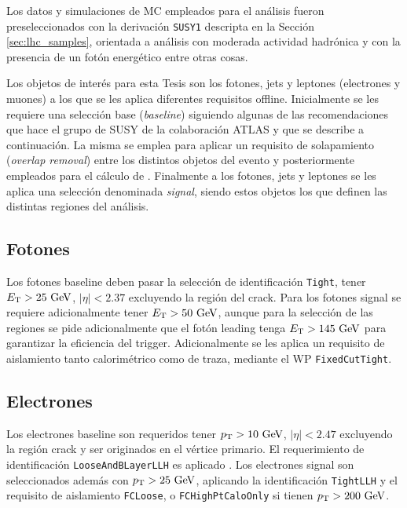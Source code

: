 Los datos y simulaciones de MC empleados para el análisis fueron preseleccionados con la derivación \texttt{SUSY1} descripta en la Sección \ref{sec:lhc_samples}, orientada a análisis con moderada actividad hadrónica y con la presencia de un fotón energético entre otras cosas.

Los objetos de interés para esta Tesis son los fotones, jets y leptones (electrones y muones) a los que se les aplica diferentes requisitos offline. Inicialmente se les requiere una selección base (\textit{baseline}) siguiendo algunas de las recomendaciones que hace el grupo de SUSY de la colaboración ATLAS y que se describe a continuación. La misma se emplea para aplicar un requisito de solapamiento (\textit{overlap removal}) entre los distintos objetos del evento y posteriormente empleados para el cálculo de \met. Finalmente a los fotones, jets y leptones se les aplica una selección denominada \textit{signal}, siendo estos objetos los que definen las distintas regiones del análisis.


\subsection{Fotones}

Los fotones baseline deben pasar la selección de identificación \texttt{Tight}, tener $\ET>25\ \gev$, $|\eta|<2.37$ excluyendo la región del crack. Para los fotones signal se requiere adicionalmente tener $E_{\text{T}}>50\ \text{GeV}$, aunque para la selección de las regiones se pide adicionalmente que el fotón leading tenga $E_{\text{T}}>145\ \text{GeV}$ para garantizar la eficiencia del trigger. Adicionalmente se les aplica un requisito de aislamiento tanto calorimétrico como de traza, mediante el WP \texttt{FixedCutTight}.


\subsection{Electrones}

Los electrones baseline son requeridos tener $p_{\text{T}}>10\ \text{GeV}$, $|\eta|<2.47$ excluyendo la región crack y ser originados en el vértice primario. El requerimiento de identificación \texttt{LooseAndBLayerLLH} es aplicado . Los electrones signal son seleccionados además con $p_{\text{T}}>25\ \text{GeV}$, aplicando la identificación \texttt{TightLLH} y el requisito de aislamiento \texttt{FCLoose}, o \texttt{FCHighPtCaloOnly} si tienen $p_{\text{T}}>200\ \text{GeV}$.


